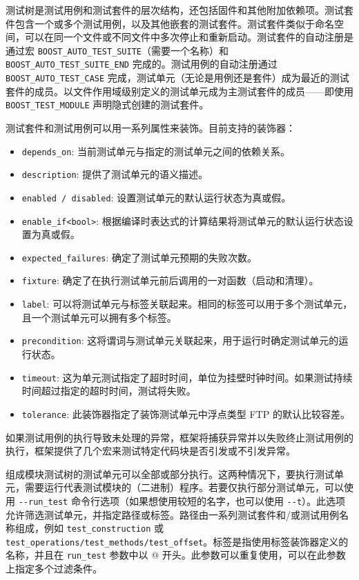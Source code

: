 
测试树是测试用例和测试套件的层次结构，还包括固件和其他附加依赖项。测试套件包含一个或多个测试用例，以及其他嵌套的测试套件。测试套件类似于命名空间，可以在同一个文件或不同文件中多次停止和重新启动。测试套件的自动注册是通过宏 \verb|BOOST_AUTO_TEST_SUITE|（需要一个名称）和 \verb|BOOST_AUTO_TEST_SUITE_END| 完成的。测试用例的自动注册通过 \verb|BOOST_AUTO_TEST_CASE| 完成，测试单元（无论是用例还是套件）成为最近的测试套件的成员。以文件作用域级别定义的测试单元成为主测试套件的成员——即使用 \verb|BOOST_TEST_MODULE| 声明隐式创建的测试套件。

测试套件和测试用例可以用一系列属性来装饰。目前支持的装饰器：

\begin{itemize}
\item
\verb|depends_on|: 当前测试单元与指定的测试单元之间的依赖关系。

\item
\verb|description|: 提供了测试单元的语义描述。

\item
\verb|enabled / disabled|: 设置测试单元的默认运行状态为真或假。

\item
\verb|enable_if<bool>|: 根据编译时表达式的计算结果将测试单元的默认运行状态设置为真或假。

\item
\verb|expected_failures|: 确定了测试单元预期的失败次数。

\item
\verb|fixture|: 确定了在执行测试单元前后调用的一对函数（启动和清理）。

\item
\verb|label|: 可以将测试单元与标签关联起来。相同的标签可以用于多个测试单元，且一个测试单元可以拥有多个标签。

\item
\verb|precondition|: 这将谓词与测试单元关联起来，用于运行时确定测试单元的运行状态。

\item
\verb|timeout|: 这为单元测试指定了超时时间，单位为挂壁时钟时间。如果测试持续时间超过指定的超时时间，测试将失败。

\item
\verb|tolerance|: 此装饰器指定了装饰测试单元中浮点类型 FTP 的默认比较容差。
\end{itemize}

如果测试用例的执行导致未处理的异常，框架将捕获异常并以失败终止测试用例的执行，框架提供了几个宏来测试特定代码块是否引发或不引发异常。

组成模块测试树的测试单元可以全部或部分执行。这两种情况下，要执行测试单元，需要运行代表测试模块的（二进制）程序。若要仅执行部分测试单元，可以使用 \verb|--run_test| 命令行选项（如果想使用较短的名字，也可以使用 \verb|--t|）。此选项允许筛选测试单元，并指定路径或标签。路径由一系列测试套件和/或测试用例名称组成，例如 \verb|test_construction| 或 \verb|test_operations/test_methods/test_offset|。标签是指使用标签装饰器定义的名称，并且在 \verb|run_test| 参数中以 @ 开头。此参数可以重复使用，可以在此参数上指定多个过滤条件。

